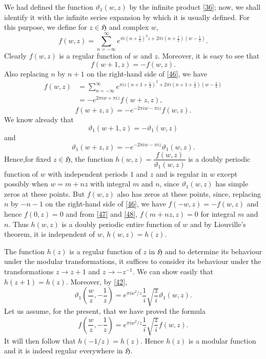We had defined the function $\vartheta_{1}(w,z)$ by the infinite
product \eqref{36}; now, we shall identify it with the infinite series
expansion by which it is usually defined. For this purpose, we define
for $z\in\mathfrak{H}$ and complex $w$,
\begin{equation*}
f(w,z)=\sum^{\infty}_{n=-\infty}e^{\pi i(n+\frac{1}{2})^{2}z+2\pi
  i(n+\frac{1}{2})(w-\frac{1}{2})}.\tag{46}\label{46} 
\end{equation*}
Clearly $f(w,z)$ is a regular function of $w$ and $z$. Moreover, it is
easy to see that
\begin{equation*}
f(w+1,z)=-f(w,z).\tag{47}\label{47}
\end{equation*}
Also replacing $n$ by $n+1$ on the right-hand side of \eqref{46}, we
have
\begin{align*}
f(w,z) &= \sum^{\infty}_{n=-\infty}e^{\pi iz(n+1+\frac{1}{2})^{2}+2\pi
  i(n+1+\frac{1}{2})(w-\frac{1}{2})}\\ 
&= -e^{2\pi iw+\pi iz}f(w+z,z),
\end{align*}
\ie
\begin{equation*}
f(w+z,z)=-e^{-2\pi iw-\pi iz}f(w,z).\tag{48}\label{48}
\end{equation*}
We know already that
$$
\vartheta_{1}(w+1,z)=-\vartheta_{1}(w,z)
$$
and
$$
\vartheta_{1}(w+z,z)=-e^{-2\pi iw-\pi iz}\vartheta_{1}(w,z).
$$
Hence,\pageoriginale for fixed $z\in\mathfrak{H}$, the function
$h(w,z)=\dfrac{f(w,z)}{\vartheta_{1}(w,z)}$ is a doubly periodic
function of $w$ with independent periods $1$ and $z$ and is regular in
$w$ except possibly when $w=m+nz$ with integral $m$ and $n$, since
$\vartheta_{1}(w,z)$ has simple zeros at these points. But $f(w,z)$
also has zeros at these points, since, replacing $n$ by $-n-1$ on the
right-hand side of \eqref{46}, we have $f(-w,z)=-f(w,z)$ and hence
$f(0,z)=0$ and from \eqref{47} and \eqref{48}, $f(m+nz,z)=0$ for
integral $m$ and $n$. Thus $h(w,z)$ is a doubly periodic entire
function of $w$ and by Liouville's theorem, it is independent of $w$,
\ie $h(w,z)=h(z)$.

The function $h(z)$ is a regular function of $z$ in $\mathfrak{H}$ and
to determine its behaviour under the modular transformations, it
suffices to consider its behaviour under the transformations $z\to
z+1$ and $z\to -z^{-1}$. We can show easily that
$h(z+1)=h(z)$. Moreover, by \eqref{42}, 
$$
\vartheta_{1}\left(\frac{w}{z},-\frac{1}{z}\right)=e^{\pi
  iw^{2}/z}\frac{1}{i}\sqrt{\frac{z}{i}}\vartheta_{1}(w,z).
$$
Let us assume, for the present, that we have proved the formula
\begin{equation*}
f\left(\frac{w}{z},-\frac{1}{z}\right)=e^{\pi
  iw^{2}/z}\frac{1}{i}\sqrt{\frac{z}{i}}f(w,z).\tag{49}\label{49} 
\end{equation*}
It will then follow that $h(-1/z)=h(z)$. Hence $h(z)$ is a modular
function and it is indeed regular everywhere in $\mathfrak{H}$.

